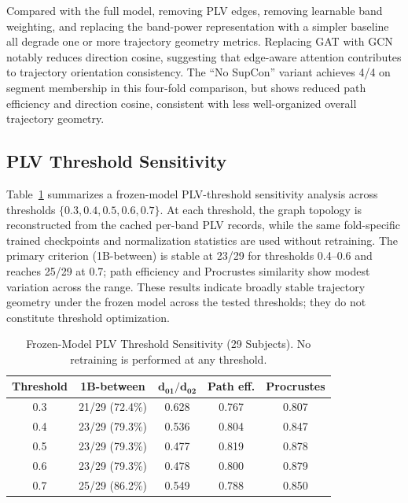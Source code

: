 \documentclass{ieeeaccess}
\begin{document}
Compared with the full model, removing PLV edges, removing learnable band
weighting, and replacing the band-power representation with a simpler baseline
all degrade one or more trajectory geometry metrics. Replacing GAT with GCN
notably reduces direction cosine, suggesting that edge-aware attention
contributes to trajectory orientation consistency. The ``No SupCon'' variant
achieves 4/4 on segment membership in this four-fold comparison, but shows
reduced path efficiency and direction cosine, consistent with less
well-organized overall trajectory geometry.

\subsection{PLV Threshold Sensitivity}

Table~\ref{tab:threshold} summarizes a frozen-model PLV-threshold sensitivity
analysis across thresholds $\{0.3, 0.4, 0.5, 0.6, 0.7\}$. At each threshold,
the graph topology is reconstructed from the cached per-band PLV records, while
the same fold-specific trained checkpoints and normalization statistics are used
without retraining. The primary criterion (1B-between) is stable at 23/29 for
thresholds 0.4--0.6 and reaches 25/29 at 0.7; path efficiency and Procrustes
similarity show modest variation across the range. These results indicate
broadly stable trajectory geometry under the frozen model across the tested
thresholds; they do not constitute threshold optimization.

\begin{table}[!t]
  \caption{Frozen-Model PLV Threshold Sensitivity (29 Subjects).
           No retraining is performed at any threshold.}
  \label{tab:threshold}
  \centering
  \begin{tabular}{ccccc}
    \toprule
    \textbf{Threshold}
      & \textbf{1B-between}
      & $\mathbf{d_{01}/d_{02}}$
      & \textbf{Path eff.}
      & \textbf{Procrustes} \\
    \midrule
    0.3 & 21/29 (72.4\%) & 0.628 & 0.767 & 0.807 \\
    0.4 & 23/29 (79.3\%) & 0.536 & 0.804 & 0.847 \\
    0.5 & 23/29 (79.3\%) & 0.477 & 0.819 & 0.878 \\
    0.6 & 23/29 (79.3\%) & 0.478 & 0.800 & 0.879 \\
    0.7 & 25/29 (86.2\%) & 0.549 & 0.788 & 0.850 \\
    \bottomrule
  \end{tabular}
\end{table}
\end{document}
